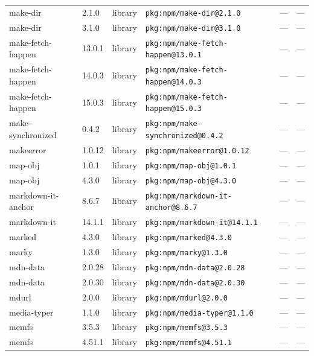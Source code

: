 \documentclass[11pt,a4paper]{article}
\begin{document}
\begin{longtable}{|p{4cm}|p{2cm}|p{1.6cm}|p{5cm}|p{1.5cm}|p{3.5cm}|}
\raggedright make-dir & 2.1.0 & library & \small\texttt{pkg:npm/make-dir@2.1.0} & — & \small — \\
\raggedright make-dir & 3.1.0 & library & \small\texttt{pkg:npm/make-dir@3.1.0} & — & \small — \\
\raggedright make-fetch-happen & 13.0.1 & library & \small\texttt{pkg:npm/make-fetch-happen@13.0.1} & — & \small — \\
\raggedright make-fetch-happen & 14.0.3 & library & \small\texttt{pkg:npm/make-fetch-happen@14.0.3} & — & \small — \\
\raggedright make-fetch-happen & 15.0.3 & library & \small\texttt{pkg:npm/make-fetch-happen@15.0.3} & — & \small — \\
\raggedright make-synchronized & 0.4.2 & library & \small\texttt{pkg:npm/make-synchronized@0.4.2} & — & \small — \\
\raggedright makeerror & 1.0.12 & library & \small\texttt{pkg:npm/makeerror@1.0.12} & — & \small — \\
\raggedright map-obj & 1.0.1 & library & \small\texttt{pkg:npm/map-obj@1.0.1} & — & \small — \\
\raggedright map-obj & 4.3.0 & library & \small\texttt{pkg:npm/map-obj@4.3.0} & — & \small — \\
\raggedright markdown-it-anchor & 8.6.7 & library & \small\texttt{pkg:npm/markdown-it-anchor@8.6.7} & — & \small — \\
\raggedright markdown-it & 14.1.1 & library & \small\texttt{pkg:npm/markdown-it@14.1.1} & — & \small — \\
\raggedright marked & 4.3.0 & library & \small\texttt{pkg:npm/marked@4.3.0} & — & \small — \\
\raggedright marky & 1.3.0 & library & \small\texttt{pkg:npm/marky@1.3.0} & — & \small — \\
\raggedright mdn-data & 2.0.28 & library & \small\texttt{pkg:npm/mdn-data@2.0.28} & — & \small — \\
\raggedright mdn-data & 2.0.30 & library & \small\texttt{pkg:npm/mdn-data@2.0.30} & — & \small — \\
\raggedright mdurl & 2.0.0 & library & \small\texttt{pkg:npm/mdurl@2.0.0} & — & \small — \\
\raggedright media-typer & 1.1.0 & library & \small\texttt{pkg:npm/media-typer@1.1.0} & — & \small — \\
\raggedright memfs & 3.5.3 & library & \small\texttt{pkg:npm/memfs@3.5.3} & — & \small — \\
\raggedright memfs & 4.51.1 & library & \small\texttt{pkg:npm/memfs@4.51.1} & — & \small — \\

\end{longtable}
\end{document}
